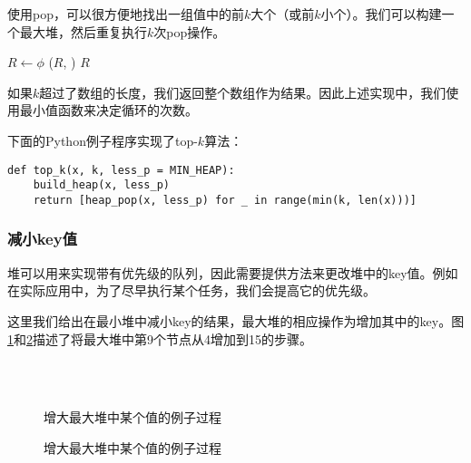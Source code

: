 \documentclass[UTF8]{article}
\begin{document}
使用pop，可以很方便地找出一组值中的前$k$大个（或前$k$小个）。我们可以构建一个最大堆，然后重复执行$k$次pop操作。

\begin{algorithmic}[1]
  \State $R \gets \phi$
  \State {}
    \State {}($R$, )
  \EndFor
  \State \Return $R$
\EndFunction
\end{algorithmic}

如果$k$超过了数组的长度，我们返回整个数组作为结果。因此上述实现中，我们使用最小值函数来决定循环的次数。

下面的Python例子程序实现了top-$k$算法：

\lstset{language=Python}
\begin{lstlisting}
def top_k(x, k, less_p = MIN_HEAP):
    build_heap(x, less_p)
    return [heap_pop(x, less_p) for _ in range(min(k, len(x)))]
\end{lstlisting}

\subsubsection{减小key值}

堆可以用来实现带有优先级的队列，因此需要提供方法来更改堆中的key值。例如在实际应用中，为了尽早执行某个任务，我们会提高它的优先级。

这里我们给出在最小堆中减小key的结果，最大堆的相应操作为增加其中的key。图\ref{fig:decrease-key-1}和\ref{fig:decrease-key-2}描述了将最大堆中第9个节点从4增加到15的步骤。

\begin{figure}[htbp]
    \centering
     \\
     \\
    \caption{增大最大堆中某个值的例子过程} \label{fig:decrease-key-1}
\end{figure}

\begin{figure}[htbp]
    \centering
    \caption{增大最大堆中某个值的例子过程} \label{fig:decrease-key-2}
\end{figure}
\end{document}
